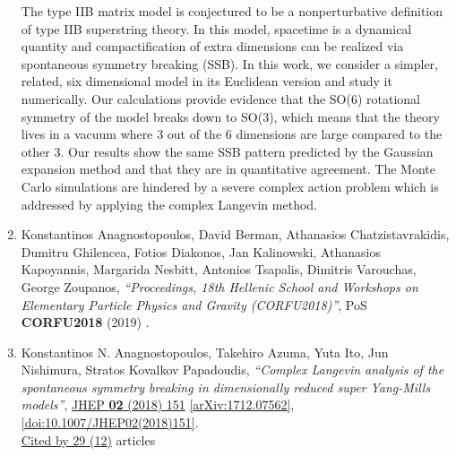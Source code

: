 \documentclass[a4paper,10pt]{article}
\begin{document}
\begin{enumerate}
The type IIB matrix model is conjectured to be a nonperturbative definition of type IIB superstring theory. In this model, spacetime is a dynamical quantity and compactification of extra dimensions can be realized via spontaneous symmetry breaking (SSB). In this work, we consider a simpler, related, six dimensional model in its Euclidean version and study it numerically. Our calculations provide evidence that the SO(6) rotational symmetry of the model breaks down to SO(3), which means that the theory lives in a vacuum where 3 out of the 6 dimensions are large compared to the other 3. Our results show the same SSB pattern predicted by the Gaussian expansion method and that they are in quantitative agreement. The Monte Carlo simulations are hindered by a severe complex action problem which is addressed by applying the complex Langevin method.
\item Konstantinos Anagnostopoulos, David Berman, Athanasios Chatzistavrakidis, Dumitru Ghilencea, Fotios Diakonos, Jan Kalinowski, Athanasios Kapoyannis, Margarida Nesbitt, Antonios Tsapalis, Dimitris Varouchas, George Zoupanos, {\it ``Proceedings, 18th Hellenic School and Workshops on Elementary Particle Physics and Gravity (CORFU2018)''}, PoS {\bf CORFU2018} (2019) .


\item Konstantinos N. Anagnostopoulos, Takehiro Azuma, Yuta Ito, Jun Nishimura, Stratos Kovalkov Papadoudis, {\it ``Complex Langevin analysis of the spontaneous symmetry breaking in dimensionally reduced super Yang-Mills models''}, \href{https://www.doi.org/10.1007/JHEP02(2018)151}{JHEP {\bf 02} (2018) 151} \href{https://arxiv.org/abs/1712.07562}{[arXiv:1712.07562]}, \href{https://www.doi.org/10.1007/JHEP02(2018)151}{[doi:10.1007/JHEP02(2018)151]}.
\\\href{https://inspirehep.net/literature/?q=refersto%3Arecid%3A1644379}{Cited by 29 (12)} articles


\end{enumerate}
\end{document}
